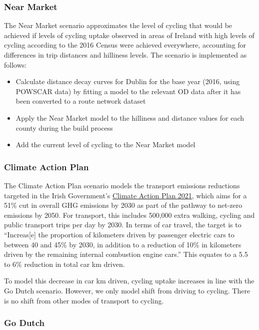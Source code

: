 \documentclass[
  super,
  preprint,
  3p]{elsarticle}
\providecommand{\tightlist}{%
  \setlength{\itemsep}{0pt}\setlength{\parskip}{0pt}}\usepackage{longtable,booktabs,array}
\begin{document}
\subsubsection{Near Market}\label{near-market}

The Near Market scenario approximates the level of cycling that would be
achieved if levels of cycling uptake observed in areas of Ireland with
high levels of cycling according to the 2016 Census were achieved
everywhere, accounting for differences in trip distances and hilliness
levels. The scenario is implemented as follows:

\begin{itemize}
\tightlist
\item
  Calculate distance decay curves for Dublin for the base year (2016,
  using POWSCAR data) by fitting a model to the relevant OD data after
  it has been converted to a route network dataset
\item
  Apply the Near Market model to the hilliness and distance values for
  each county during the build process
\item
  Add the current level of cycling to the Near Market model
\end{itemize}

\subsubsection{Climate Action Plan}\label{climate-action-plan}

The Climate Action Plan scenario models the transport emissions
reductions targeted in the Irish Government's
\href{https://www.gov.ie/en/publication/6223e-climate-action-plan-2021/}{Climate
Action Plan 2021}, which aims for a 51\% cut in overall GHG emissions by
2030 as part of the pathway to net-zero emissions by 2050. For
transport, this includes 500,000 extra walking, cycling and public
transport trips per day by 2030. In terms of car travel, the target is
to ``Increas{[}e{]} the proportion of kilometers driven by passenger
electric cars to between 40 and 45\% by 2030, in addition to a reduction
of 10\% in kilometers driven by the remaining internal combustion engine
cars.'' This equates to a 5.5 to 6\% reduction in total car km driven.

To model this decrease in car km driven, cycling uptake increases in
line with the Go Dutch scenario. However, we only model shift from
driving to cycling. There is no shift from other modes of transport to
cycling.

\subsubsection{Go Dutch}\label{go-dutch}
\end{document}

